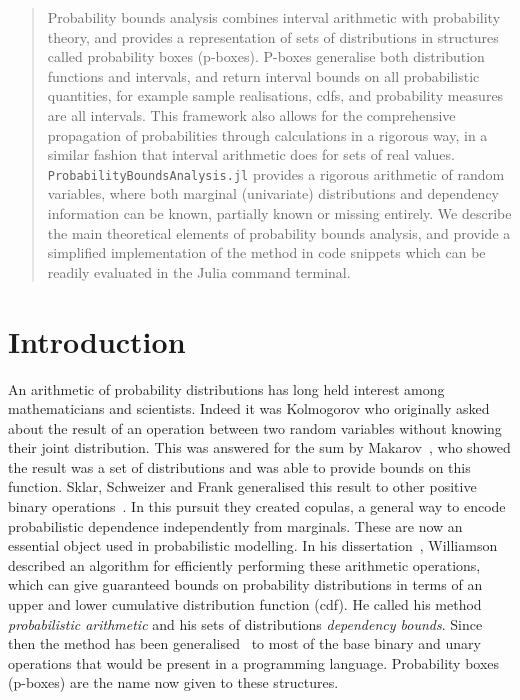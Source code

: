 \documentclass{juliacon}
\begin{document}

\maketitle
\begin{abstract}
Probability bounds analysis combines interval arithmetic with probability theory, and provides a representation of sets of distributions in structures called probability boxes (p-boxes). P-boxes generalise both distribution functions and intervals, and return interval bounds on all probabilistic quantities, for example sample realisations, cdfs, and probability measures are all intervals. This framework also allows for the comprehensive propagation of probabilities through calculations in a rigorous way, in a similar fashion that interval arithmetic does for sets of real values. \texttt{ProbabilityBoundsAnalysis.jl} provides a rigorous arithmetic of random variables, where both marginal (univariate) distributions and dependency information can be known, partially known or missing entirely. We describe the main theoretical elements of probability bounds analysis, and provide a simplified implementation of the method in code snippets which can be readily evaluated in the Julia command terminal.
\end{abstract}
\section{Introduction}
\label{sec:intro}
An arithmetic of probability distributions has long held interest among mathematicians and scientists. Indeed it was Kolmogorov who originally asked about the result of an operation between two random variables without knowing their joint distribution. This was answered for the sum by Makarov~\cite{makarov1982estimates}, who showed the result was a set of distributions and was able to provide bounds on this function. Sklar, Schweizer and Frank generalised this result to other positive binary operations~\cite{frank1987best,schweizer2011probabilistic}. In this pursuit they created copulas, a general way to encode probabilistic dependence independently from marginals. These are now an essential object used in probabilistic modelling. In his dissertation~\cite{williamson1989probabilistic}, Williamson described an algorithm for efficiently performing these arithmetic operations, which can give guaranteed bounds on probability distributions in terms of an upper and lower cumulative distribution function (cdf). He called his method \textit{probabilistic arithmetic} and his sets of distributions \textit{dependency bounds}. Since then the method has been generalised~\cite{ferson2015constructing,ferson1996whereof,ferson2004arithmetic} to most of the base binary and unary operations that would be present in a programming language. Probability boxes (p-boxes) are the name now given to these structures.
\end{document}
